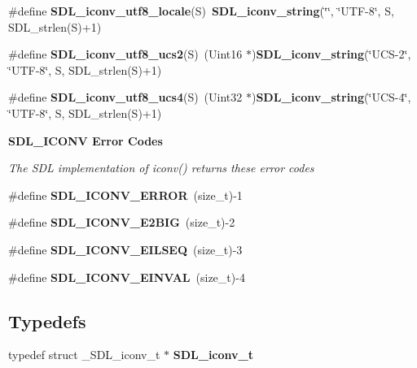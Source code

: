 \begin{DoxyCompactItemize}
\item 
\#define {\bfseries S\+D\+L\+\_\+iconv\+\_\+utf8\+\_\+locale}(S)~{\bf S\+D\+L\+\_\+iconv\+\_\+string}(\char`\"{}\char`\"{}, \char`\"{}U\+T\+F-\/8\char`\"{}, S, S\+D\+L\+\_\+strlen(S)+1)\label{_s_d_l__stdinc_8h_a773e5f83e392495ad8abab8d71aa84c6}

\item 
\#define {\bfseries S\+D\+L\+\_\+iconv\+\_\+utf8\+\_\+ucs2}(S)~(Uint16 $\ast$){\bf S\+D\+L\+\_\+iconv\+\_\+string}(\char`\"{}U\+C\+S-\/2\char`\"{}, \char`\"{}U\+T\+F-\/8\char`\"{}, S, S\+D\+L\+\_\+strlen(S)+1)\label{_s_d_l__stdinc_8h_a59cd43c02306558671fe05c23284ab3b}

\item 
\#define {\bfseries S\+D\+L\+\_\+iconv\+\_\+utf8\+\_\+ucs4}(S)~(Uint32 $\ast$){\bf S\+D\+L\+\_\+iconv\+\_\+string}(\char`\"{}U\+C\+S-\/4\char`\"{}, \char`\"{}U\+T\+F-\/8\char`\"{}, S, S\+D\+L\+\_\+strlen(S)+1)\label{_s_d_l__stdinc_8h_acdced7c8985d280d87e659f583a5479e}

\end{DoxyCompactItemize}
\begin{Indent}{\bf S\+D\+L\+\_\+\+I\+C\+O\+N\+V Error Codes}\par
{\em The S\+D\+L implementation of iconv() returns these error codes }\begin{DoxyCompactItemize}
\item 
\#define {\bfseries S\+D\+L\+\_\+\+I\+C\+O\+N\+V\+\_\+\+E\+R\+R\+O\+R}~(size\+\_\+t)-\/1\label{_s_d_l__stdinc_8h_ada422bea61b05ed228c4f42e4aea2144}

\item 
\#define {\bfseries S\+D\+L\+\_\+\+I\+C\+O\+N\+V\+\_\+\+E2\+B\+I\+G}~(size\+\_\+t)-\/2\label{_s_d_l__stdinc_8h_a8147462b96bda427f0b41125e645b9ab}

\item 
\#define {\bfseries S\+D\+L\+\_\+\+I\+C\+O\+N\+V\+\_\+\+E\+I\+L\+S\+E\+Q}~(size\+\_\+t)-\/3\label{_s_d_l__stdinc_8h_adc8b6997623c449e7ed53a605faa9eb0}

\item 
\#define {\bfseries S\+D\+L\+\_\+\+I\+C\+O\+N\+V\+\_\+\+E\+I\+N\+V\+A\+L}~(size\+\_\+t)-\/4\label{_s_d_l__stdinc_8h_a03d30a2857731df69d31ffa802424a9e}

\end{DoxyCompactItemize}
\end{Indent}
\subsection*{Typedefs}
\begin{DoxyCompactItemize}
\item 
typedef struct \+\_\+\+S\+D\+L\+\_\+iconv\+\_\+t $\ast$ {\bfseries S\+D\+L\+\_\+iconv\+\_\+t}\label{_s_d_l__stdinc_8h_a37ee875bea397030104764a92857ae79}

\end{DoxyCompactItemize}
